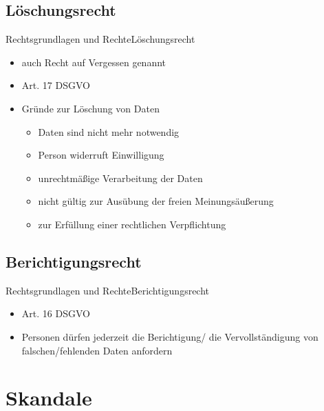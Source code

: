 \documentclass[9pt]{beamer}
\begin{document}
        \subsection{Löschungsrecht}
            \begin{frame}{Rechtsgrundlagen und Rechte}{Löschungsrecht}
                \begin{itemize}
                    \item auch Recht auf Vergessen genannt 
                    \item Art. 17 DSGVO
                    \item Gründe zur Löschung von Daten
                    \begin{itemize}
                        \item Daten sind nicht mehr notwendig
                        \item Person widerruft Einwilligung
                        \item unrechtmäßige Verarbeitung der Daten
                        \item nicht gültig zur Ausübung der freien Meinungsäußerung
                        \item zur Erfüllung einer rechtlichen Verpflichtung
                    \end{itemize}
                \end{itemize}
            \end{frame}


        \subsection{Berichtigungsrecht}
            \begin{frame}{Rechtsgrundlagen und Rechte}{Berichtigungsrecht}
                \begin{itemize}
                    \item Art. 16 DSGVO
                    \item Personen dürfen jederzeit die Berichtigung/ die Vervollständigung von falschen/fehlenden Daten anfordern
                \end{itemize}
        \end{frame}



    \section{Skandale}
\end{document}

